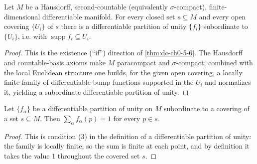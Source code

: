 \begin{lemma}
  \label{lem:dc-ch0-5-6-exists}
  \leanok
  Let $M$ be a Hausdorff, second-countable (equivalently $\sigma$-compact),
  finite-dimensional differentiable manifold. For every closed set $s\subseteq M$
  and every open covering $\{U_i\}$ of $s$ there is a differentiable partition of
  unity $\{f_i\}$ subordinate to $\{U_i\}$, i.e. with
  $\operatorname{supp} f_i\subseteq U_i$.
\end{lemma}
\begin{proof}
  \leanok
  This is the existence (``if'') direction of \cref{thm:dc-ch0-5-6}. The Hausdorff
  and countable-basis axioms make $M$ paracompact and $\sigma$-compact; combined
  with the local Euclidean structure one builds, for the given open covering, a
  locally finite family of differentiable bump functions supported in the $U_i$
  and normalizes it, yielding a subordinate differentiable partition of unity.
\end{proof}

\begin{lemma}
  \label{lem:dc-ch0-5-6-sum}
  \leanok
  Let $\{f_\alpha\}$ be a differentiable partition of unity on $M$ subordinate to a
  covering of a set $s\subseteq M$. Then $\sum_\alpha f_\alpha(p)=1$ for every
  $p\in s$.
\end{lemma}
\begin{proof}
  \leanok
  This is condition (3) in the definition of a differentiable partition of unity:
  the family is locally finite, so the sum is finite at each point, and by
  definition it takes the value $1$ throughout the covered set $s$.
\end{proof}

